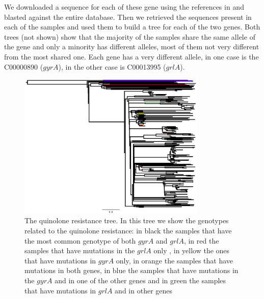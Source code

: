 \documentclass[12pt,a4paper]{article}
\begin{document}
We downloaded a sequence for each of these gene using the references in \cite{gordon} and blasted against the entire database.
Then we retrieved the sequences present in each of the samples and used them to build a tree for each of the two genes.  Both trees (not shown) show that the majority of the samples share the same allele of the gene and only a minority has different alleles, most of them not very different from the most shared one. Each gene has a very different allele, in one case is the C00000890 ($gyrA$), in the other case is C00013995 ($grlA$).

\begin{figure}[hb]
  \centering
  \includegraphics[width=0.8\textwidth]{treeQuin2.pdf}
  \caption[Tree]
   {The quinolone resistance tree. In this tree we show the genotypes related to the quinolone resistance: in black the samples that have the most common genotype of both $gyrA$ and $grlA$, in red the samples that have mutations in the $grlA$ only , in yellow the ones that have mutations in $gyrA$ only, in orange the samples that have mutations in both genes, in blue the samples that have mutations in the $gyrA$ and in one of the other genes and in green the samples that have mutations in $grlA$ and in other genes}\label{QuinTree}
\end{figure}
\end{document}

